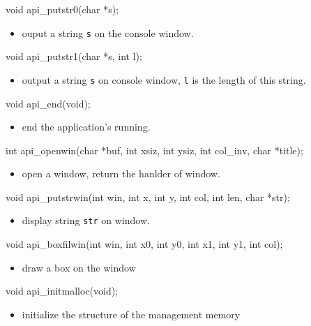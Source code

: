 \documentclass{swfcthesis}
\begin{document}
\begin{ccode}
void api_putstr0(char *s);
\end{ccode}
\begin{itemize}
\item ouput a string \texttt{s} on the console window.
\end{itemize}



\begin{ccode}
void api_putstr1(char *s, int l);
\end{ccode}
\begin{itemize}
\item output a string \texttt{s} on console window, \texttt{l} is the length of this string.
\end{itemize}


\begin{ccode}
void api_end(void);
\end{ccode}
\begin{itemize}
\item end the application's running.
\end{itemize}


\begin{ccode}
int api_openwin(char *buf, int xsiz, int ysiz, int col_inv, char *title);
\end{ccode}
\begin{itemize}
\item open a window, return the hanlder of window.
\end{itemize}


\begin{ccode}
void api_putstrwin(int win, int x, int y, int col, int len, char *str);
\end{ccode}
\begin{itemize}
\item display string \texttt{str} on window. 
\end{itemize}



\begin{ccode}
void api_boxfilwin(int win, int x0, int y0, int x1, int y1, int col);
\end{ccode}
\begin{itemize}
\item draw a box on the window
\end{itemize}



\begin{ccode}
void api_initmalloc(void);
\end{ccode}
\begin{itemize}
\item initialize the structure of the management memory
\end{itemize}
\end{document}
